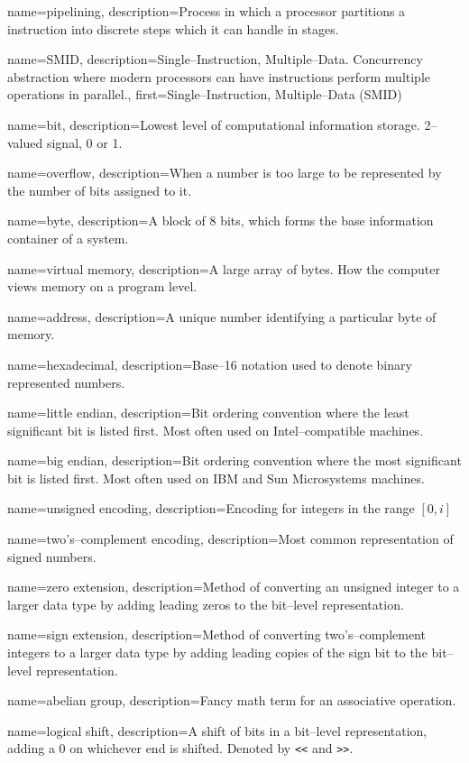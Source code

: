  {
    name=pipelining,
    description={Process in which a processor partitions a instruction into discrete steps which it can handle in stages.}
}

 {
    name=SMID,
    description={Single--Instruction, Multiple--Data. Concurrency abstraction where modern processors can have instructions perform multiple operations in parallel.},
    first={Single--Instruction, Multiple--Data (SMID)}
}

 {
    name=bit,
    description={Lowest level of computational information storage. 2--valued signal, 0 or 1.}
}

 {
    name=overflow,
    description={When a number is too large to be represented by the number of bits assigned to it.}
}

 {
    name=byte,
    description={A block of 8 bits, which forms the base information container of a system.}
}

 {
    name=virtual memory,
    description={A large array of bytes. How the computer views memory on a program level.}
}

 {
    name=address,
    description={A unique number identifying a particular byte of memory.}
}

 {
    name=hexadecimal,
    description={Base--16 notation used to denote binary represented numbers.}
}

 {
    name=little endian,
    description={Bit ordering convention where the least significant bit is listed first. Most often used on Intel--compatible machines.}
}

 {
    name=big endian,
    description={Bit ordering convention where the most significant bit is listed first. Most often used on IBM and Sun Microsystems machines.}
}

 {
    name=unsigned encoding,
    description={Encoding for integers in the range \(\left[ 0, i \right]\) }
}

 {
    name=two's--complement encoding,
    description={Most common representation of signed numbers.}
}

 {
    name=zero extension,
    description={Method of converting an unsigned integer to a larger data type by adding leading zeros to the bit--level representation.}
}

 {
    name=sign extension,
    description={Method of converting two's--complement integers to a larger data type by adding leading copies of the sign bit to the bit--level representation.}
}

 {
    name=abelian group,
    description={Fancy math term for an associative operation.}
}

 {
    name=logical shift,
    description={A shift of bits in a bit--level representation, adding a 0 on whichever end is shifted. Denoted by \texttt{<<} and \texttt{>>}}.
}
